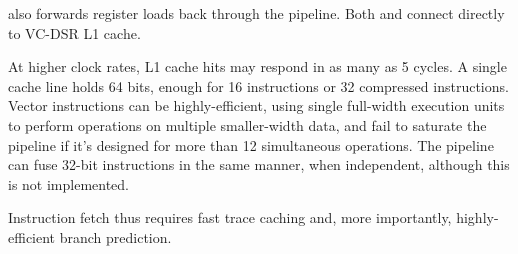  also forwards register loads back through the
pipeline.  Both  and  connect
directly to VC-DSR L1 cache.

At higher clock rates, L1 cache hits may respond in as many as 5 cycles.  A
single cache line holds 64 bits, enough for 16 instructions or 32 compressed
instructions.  Vector instructions can be highly-efficient, using single
full-width execution units to perform operations on multiple smaller-width
data, and fail to saturate the pipeline if it's designed for more than 12
simultaneous operations.  The pipeline can fuse 32-bit instructions in the same
manner, when independent, although this is not implemented.

Instruction fetch thus requires fast trace caching and, more importantly,
highly-efficient branch prediction.
